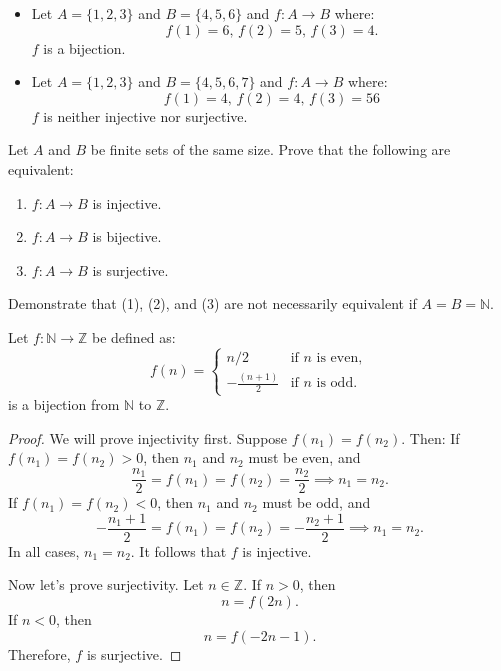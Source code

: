 \documentclass[11pt]{article}
\begin{document}
\begin{itemize}
    \item Let $A = \{1, 2, 3\}$ and $B = \{4, 5, 6\}$ and $f : A \to B$ where:
          \[
              f(1) = 6, \, f(2) = 5, \, f(3) = 4.
          \]
          $f$ is a bijection.
    \item Let $A = \{1, 2, 3\}$ and $B = \{4, 5, 6, 7\}$ and $f : A \to B$ where:
          \[
              f(1) = 4, \, f(2) = 4, \, f(3) = 56
          \]
          $f$ is neither injective nor surjective.

\end{itemize}
\begin{question*}
    Let $A$ and $B$ be finite sets of the same size. Prove that the following are
    equivalent:
    \begin{enumerate}
        \item $f : A \to B$ is injective.
        \item $f : A \to B$ is bijective.
        \item $f : A \to B$ is surjective.
    \end{enumerate}
    Demonstrate that (1), (2), and (3) are not necessarily equivalent if $A = B = \mathbb{N}$.
\end{question*}
\begin{example}
    Let $f : \mathbb{N} \to \mathbb{Z}$ be defined as:
    \[
        f(n) =
        \begin{cases}
            n / 2              & \text{if } n \text{ is even}, \\
            -\frac{(n + 1)}{2} & \text{if } n \text{ is odd}.
        \end{cases}
    \]
    is a bijection from $\mathbb{N}$ to $\mathbb{Z}$.
\end{example}
\begin{proof}
    We will prove injectivity first. Suppose \( f(n_1) = f(n_2) \). Then:
    If \( f(n_1) = f(n_2) > 0 \), then \( n_1 \) and \( n_2 \) must be even, and
    \[
        \frac{n_1}{2} = f(n_1) = f(n_2) = \frac{n_2}{2} \implies n_1 = n_2.
    \]
    If \( f(n_1) = f(n_2) < 0 \), then \( n_1 \) and \( n_2 \) must be odd, and
    \[
        -\frac{n_1 + 1}{2} = f(n_1) = f(n_2) = -\frac{n_2 + 1}{2} \implies n_1 = n_2.
    \]
    In all cases, \( n_1 = n_2 \). It follows that \( f \) is injective.

    Now let's prove surjectivity. Let \( n \in \mathbb{Z} \). If \( n > 0 \), then
    \[
        n = f(2n).
    \]
    If \( n < 0 \), then
    \[
        n = f(-2n - 1).
    \]
    Therefore, \( f \) is surjective.
\end{proof}
\end{document}
